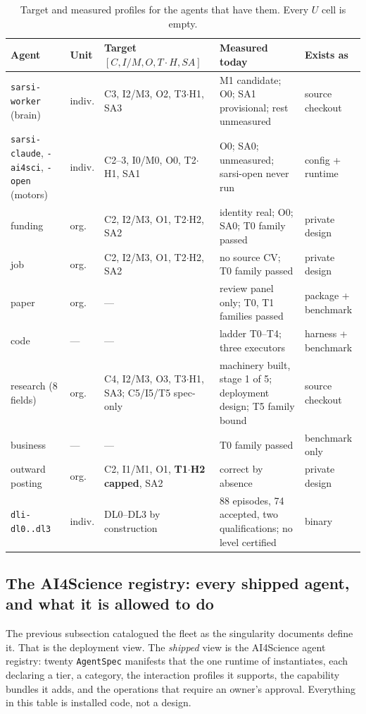 \documentclass[11pt]{article}
\theoremstyle{definition}
\begin{document}
\begin{table}[!htbp]
\centering\footnotesize
\begin{tabularx}{\textwidth}{@{}p{2.3cm}p{1.1cm}YYp{2.4cm}@{}}
\toprule
Agent & Unit & Target $[C, I/M, O, T{\cdot}H, SA]$ & Measured today & Exists as \\
\midrule
\texttt{sarsi-worker} (brain) & indiv. & C3, I2/M3, O2, T3$\cdot$H1, SA3 & M1 candidate; O0; SA1 provisional; rest unmeasured & source checkout \\
\texttt{sarsi-claude}, \texttt{-ai4sci}, \texttt{-open} (motors) & indiv. & C2--3, I0/M0, O0, T2$\cdot$H1, SA1 & O0; SA0; unmeasured; sarsi-open never run & config + runtime \\
funding & org. & C2, I2/M3, O1, T2$\cdot$H2, SA2 & identity real; O0; SA0; T0 family passed & private design \\
job & org. & C2, I2/M3, O1, T2$\cdot$H2, SA2 & no source CV; T0 family passed & private design \\
paper & org. & --- & review panel only; T0, T1 families passed & package + benchmark \\
code & --- & --- & ladder T0--T4; three executors & harness + benchmark \\
research (8 fields) & org. & C4, I2/M3, O3, T3$\cdot$H1, SA3; C5/I5/T5 spec-only & machinery built, stage 1 of 5; deployment design; T5 family bound & source checkout \\
business & --- & --- & T0 family passed & benchmark only \\
outward posting & org. & C2, I1/M1, O1, \textbf{T1$\cdot$H2 capped}, SA2 & correct by absence & private design \\
\texttt{dli-dl0..dl3} & indiv. & DL0--DL3 by construction & 88 episodes, 74 accepted, two qualifications; no level certified & binary \\
\bottomrule
\end{tabularx}
\caption{Target and measured profiles for the agents that have them. Every $U$ cell is empty.}
\label{tab:fleet}
\end{table}

\subsection{The AI4Science registry: every shipped agent, and what it is allowed to do}\label{sec:registry}

The previous subsection catalogued the fleet as the singularity documents define it. That is the deployment view. The \emph{shipped} view is the AI4Science agent registry: twenty \texttt{AgentSpec} manifests that the one runtime of \citet{yang2026harness} instantiates, each declaring a tier, a category, the interaction profiles it supports, the capability bundles it adds, and the operations that require an owner's approval. Everything in this table is installed code, not a design.
\end{document}
